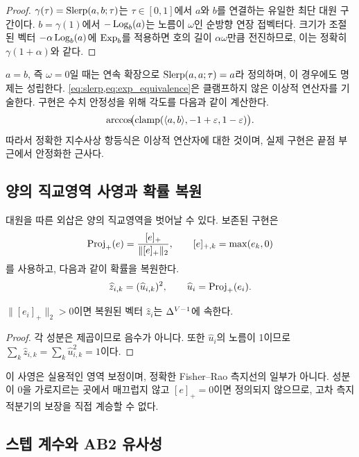 \begin{proof}
$\gamma(\tau)=\operatorname{Slerp}(a,b;\tau)$는 $\tau\in[0,1]$에서 $a$와 $b$를 연결하는 유일한 최단 대원
구간이다. $b=\gamma(1)$에서 $-\operatorname{Log}_b(a)$는 노름이 $\omega$인 순방향 연장 접벡터다.
크기가 조절된 벡터 $-\alpha\operatorname{Log}_b(a)$에 $\operatorname{Exp}_b$를 적용하면 호의 길이 $\alpha\omega$만큼
전진하므로, 이는 정확히 $\gamma(1+\alpha)$와 같다.
\end{proof}

$a=b$, 즉 $\omega=0$일 때는 연속 확장으로 $\operatorname{Slerp}(a,a;\tau)=a$라 정의하며, 이 경우에도
명제는 성립한다. \cref{eq:slerp,eq:exp_equivalence}은 클램프하지 않은 이상적 연산자를
기술한다. 구현은 수치 안정성을 위해 각도를 다음과 같이 계산한다.
\[
\arccos\!\bigl(\operatorname{clamp}(\langle a,b\rangle,-1+\varepsilon,1-\varepsilon)\bigr).
\]
따라서 정확한
지수사상 항등식은 이상적 연산자에 대한 것이며, 실제 구현은 끝점 부근에서 안정화한 근사다.

\subsection{양의 직교영역 사영과 확률 복원}

대원을 따른 외삽은 양의 직교영역을 벗어날 수 있다. 보존된 구현은
\begin{equation}
  \operatorname{Proj}_{+}(e)=\frac{[e]_+}{\lVert[e]_+\rVert_2},
  \qquad [e]_{+,k}=\max(e_k,0)
  \label{eq:retraction}
\end{equation}
를 사용하고, 다음과 같이 확률을 복원한다.
\begin{equation}
  \widehat z_{i,k}=(\widehat u_{i,k})^2,
  \qquad \widehat u_i=\operatorname{Proj}_{+}(e_i).
  \label{eq:prob_recovery}
\end{equation}

\begin{proposition}
$\lVert[e_i]_+\rVert_2>0$이면 복원된 벡터 $\widehat z_i$는 $\Delta^{V-1}$에 속한다.
\end{proposition}

\begin{proof}
각 성분은 제곱이므로 음수가 아니다. 또한 $\widehat u_i$의 노름이 1이므로
$\sum_k\widehat z_{i,k}=\sum_k\widehat u_{i,k}^2=1$이다.
\end{proof}

이 사영은 실용적인 영역 보정이며, 정확한 Fisher--Rao 측지선의 일부가 아니다. 성분이 0을
가로지르는 곳에서 매끄럽지 않고 $[e]_+=0$이면 정의되지 않으므로, 고차 측지 적분기의 보장을
직접 계승할 수 없다.

\subsection{스텝 계수와 AB2 유사성}

